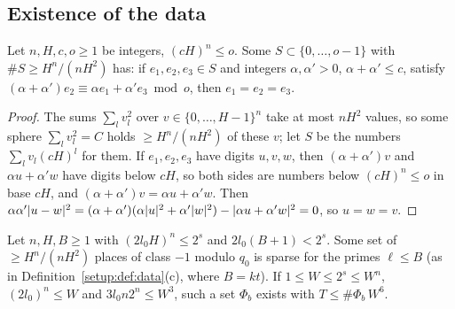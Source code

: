 \subsection{Existence of the data}

\begin{lemma}\label{data:lem:behrend}
Let $n, H, c, o \ge 1$ be integers, $(cH)^n \le o$. Some $S \subset \{0, \dots, o-1\}$ with
$\#S \ge H^n/(nH^2)$ has: if $e_1, e_2, e_3 \in S$ and integers $\alpha, \alpha' > 0$,
$\alpha + \alpha' \le c$, satisfy $(\alpha+\alpha')e_2 \equiv \alpha e_1 + \alpha' e_3 \bmod o$, then
$e_1 = e_2 = e_3$.
\end{lemma}

\begin{proof}
The sums $\sum_l v_l^2$ over $v \in \{0,\dots,H-1\}^n$ take at most $nH^2$ values, so some sphere
$\sum_l v_l^2 = C$ holds $\ge H^n/(nH^2)$ of these $v$; let $S$ be the numbers
$\sum_l v_l(cH)^l$ for them. If $e_1, e_2, e_3$ have digits $u, v, w$, then $(\alpha+\alpha')v$ and
$\alpha u + \alpha' w$ have digits below $cH$, so both sides are numbers below $(cH)^n \le o$ in
base $cH$, and $(\alpha+\alpha')v = \alpha u + \alpha' w$. Then
$\alpha\alpha'\lvert u-w\rvert^2 = (\alpha+\alpha')(\alpha\lvert u\rvert^2 + \alpha'\lvert w\rvert^2)
- \lvert\alpha u+\alpha'w\rvert^2 = 0$, so $u = w = v$.
\end{proof}

\begin{proposition}\label{data:prop:sparse}
Let $n, H, B \ge 1$ with $(2l_0H)^n \le 2^s$ and $2l_0(B+1) < 2^s$. Some set of $\ge H^n/(nH^2)$
places of class $-1$ modulo $q_0$ is sparse for the primes $\ell \le B$ (as in
Definition~\ref{setup:def:data}(c), where $B = kt$). If $1 \le W \le 2^s \le W^n$,
$(2l_0)^n \le W$ and $3l_0n2^n \le W^3$, such a set $\Phi_b$ exists with $T \le \#\Phi_b\, W^6$.
\end{proposition}

